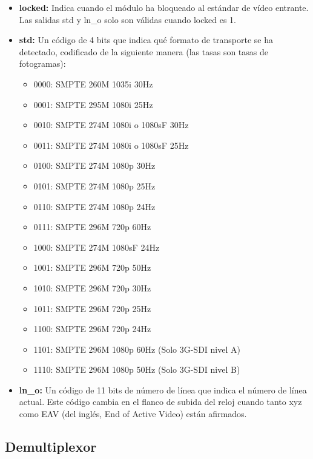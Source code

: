 \begin{itemize}
    \item \textbf{locked:} Indica cuando el módulo ha bloqueado al estándar de
    vídeo entrante. Las salidas std y ln\_o solo son válidas cuando locked es 1. \\
    \item \textbf{std:} Un código de 4 bits que indica qué formato de transporte
    se ha detectado, codificado de la siguiente manera (las tasas son tasas de
    fotogramas): \\
    \begin{itemize}
        \item 0000: SMPTE 260M 1035i           30Hz
        \item 0001: SMPTE 295M 1080i           25Hz
        \item 0010: SMPTE 274M 1080i o 1080sF  30Hz
        \item 0011: SMPTE 274M 1080i o 1080sF  25Hz
        \item 0100: SMPTE 274M 1080p           30Hz   
        \item 0101: SMPTE 274M 1080p           25Hz   
        \item 0110: SMPTE 274M 1080p           24Hz
        \item 0111: SMPTE 296M 720p            60Hz
        \item 1000: SMPTE 274M 1080sF          24Hz
        \item 1001: SMPTE 296M 720p            50Hz
        \item 1010: SMPTE 296M 720p            30Hz
        \item 1011: SMPTE 296M 720p            25Hz
        \item 1100: SMPTE 296M 720p            24Hz
        \item 1101: SMPTE 296M 1080p           60Hz    (Solo 3G-SDI nivel A)
        \item 1110: SMPTE 296M 1080p           50Hz    (Solo 3G-SDI nivel B)
    \end{itemize}
    \item \textbf{ln\_o:} Un código de 11 bits de número de línea que indica el
    número de línea actual. Este código cambia en el flanco de subida del reloj
    cuando tanto xyz como EAV  (del inglés, End of Active Video) están afirmados.
\end{itemize}

\subsection{Demultiplexor}

